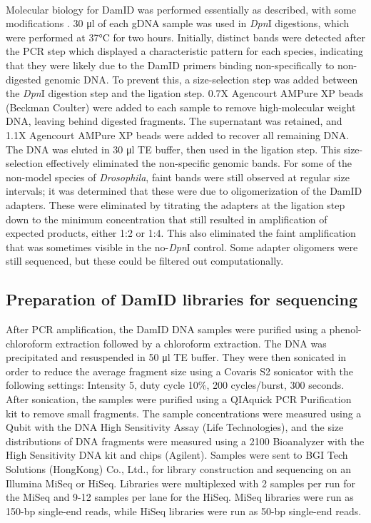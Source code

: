 \paragraph{}
Molecular biology for DamID was performed essentially as described, with some modifications \citep{vogel_detection_2007}. 30 μl of each gDNA sample was used in \emph{Dpn}I digestions, which were performed at 37°C for two hours. Initially, distinct bands were detected after the PCR step which displayed a characteristic pattern for each species, indicating that they were likely due to the DamID primers binding non-specifically to non-digested genomic DNA. To prevent this, a size-selection step was added between the \emph{Dpn}I digestion step and the ligation step. 0.7X Agencourt AMPure XP beads (Beckman Coulter) were added to each sample to remove high-molecular weight DNA, leaving behind digested fragments. The supernatant was retained, and 1.1X Agencourt AMPure XP beads were added to recover all remaining DNA. The DNA was eluted in 30 μl TE buffer, then used in the ligation step. This size-selection effectively eliminated the non-specific genomic bands. For some of the non-model species of \emph{Drosophila}, faint bands were still observed at regular size intervals; it was determined that these were due to oligomerization of the DamID adapters. These were eliminated by titrating the adapters at the ligation step down to the minimum concentration that still resulted in amplification of expected products, either 1:2 or 1:4. This also eliminated the faint amplification that was sometimes visible in the no-\emph{Dpn}I control. Some adapter oligomers were still sequenced, but these could be filtered out computationally.  

\subsection{Preparation of DamID libraries for sequencing}
After PCR amplification, the DamID DNA samples were purified using a phenol-chloroform extraction followed by a chloroform extraction. The DNA was precipitated and resuspended in 50 μl TE buffer. They were then sonicated in order to reduce the average fragment size using a Covaris S2 sonicator with the following settings: Intensity 5, duty cycle 10\%, 200 cycles/burst, 300 seconds. After sonication, the samples were purified using a QIAquick PCR Purification kit to remove small fragments. The sample concentrations were measured using a Qubit with the DNA High Sensitivity Assay (Life Technologies), and the size distributions of DNA fragments were measured using a 2100 Bioanalyzer with the High Sensitivity DNA kit and chips (Agilent). Samples were sent to BGI Tech Solutions (HongKong) Co., Ltd., for library construction and sequencing on an Illumina MiSeq or HiSeq. Libraries were multiplexed with 2 samples per run for the MiSeq and 9-12 samples per lane for the HiSeq. MiSeq libraries were run as 150-bp single-end reads, while HiSeq libraries were run as 50-bp single-end reads. 


